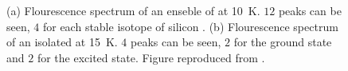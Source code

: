     \begin{figure}[thbp]
  		\begin{subfigure}[t]{ 0.49\linewidth}
  			\centering
  			\caption{}
  		\end{subfigure}
  		\hfill
  		\begin{subfigure}[t]{ 0.49\linewidth}
  			\centering
  			\caption{}
  		\end{subfigure}
  		\caption[Flourescence spectra of \sivs at low temperature]{(a) Flourescence spectrum of an enseble of \sivs at \SI{10}{\kelvin}. $12$ peaks can be seen, $4$ for each stable isotope of silicon \cite{becker::42}. (b) Flourescence spectrum of an isolated \siv at \SI{15}{\kelvin}. $4$ peaks can be seen, $2$ for the ground state and $2$ for the excited state. Figure reproduced from \cite{janine::thesis}.}
  		\label{fig::cryogenic_spectra}
  	\end{figure}
